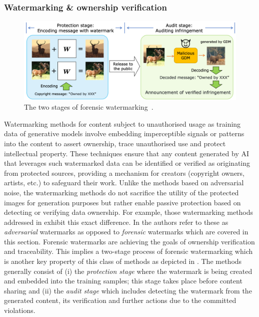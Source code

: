 \documentclass[conference]{IEEEtran}
\begin{document}
\subsubsection{Watermarking \& ownership verification}\label{sec:mitigation-watermarking}
\begin{figure}
    \centering
    \includegraphics[width=\linewidth]{figures/watermarking-stages.PNG}
    \caption{The two stages of forensic watermarking~\cite{cui_diffusionshield_2023}.}
    \label{fig:watermarking-stages}
\end{figure}
Watermarking methods for content subject to unauthorised usage as training data of generative models involve embedding imperceptible signals or patterns into the content to assert ownership, trace unauthorised use and protect intellectual property. 
These techniques ensure that any content generated by AI that leverages such watermarked data can be identified or verified as originating from protected sources, providing a mechanism for creators (copyright owners, artists, etc.) to safeguard their work. 
Unlike the methods based on adversarial noise, the watermarking methods do not sacrifice the utility of the protected images for generation purposes but rather enable passive protection based on detecting or verifying data ownership. 
For example, those watermarking methods addressed in  exhibit this exact difference. 
In \cite{zhang_editguard_2023} the authors refer to these as \textit{adversarial} watermarks as opposed to \textit{forensic} watermarks which are covered in this section. 
Forensic watermarks are achieving the goals of ownership verification and traceability. 
This implies a two-stage process of forensic watermarking which is another key property of this class of methods as depicted in . 
The methods generally consist of (i) the \textit{protection stage} where the watermark is being created and embedded into the training samples; this stage takes place before content sharing and (ii) the \textit{audit stage} which includes detecting the watermark from the generated content, its verification and further actions due to the committed violations. 
\end{document}
